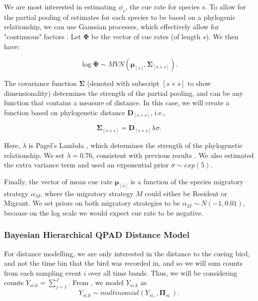 \documentclass[12pt]{article}
\begin{document}
\par We are most interested in estimating $\phi_s$, the cue rate for species $s$. 
To allow for the partial pooling of estimates for each species to be based on a phylogenic relationship, we can use Gaussian processes, which effectively allow for "continuous" factors \citep{bernardo_regression_1998, mcelreath_continous_2020}. 
Let $\mathbf{\Phi}$ be the vector of cue rates (of length $s$). 
We then have:

$$\log \mathbf{\Phi} \sim MVN\left( \mathbf{\mu}_{[s]}, \mathbf{\Sigma}_{[s \times s]} \right).$$

\par The covariance function $\mathbf{\Sigma}$ (denoted with subscript $[s \times s]$ to show dimensionality) determines the strength of the partial pooling, and can be any function that contains a measure of distance. 
In this case, we will create a function based on phylogenetic distance $\mathbf{D}_{[s \times s]}$, i.e.,

$$\mathbf{\Sigma}_{[s \times s]} = \mathbf{D}_{[s \times s]}\lambda\sigma.$$

\par Here, $\lambda$ is Pagel's Lambda \citep{pagel_inferring_1999}, which determines the strength of the phylogenetic relationship. 
We set $\lambda = 0.76$, consistent with previous results \cite{solymos_phylogeny_2018}. 
We also estimated the extra variance term and used an exponential prior $\sigma \sim exp(5)$.

\par Finally, the vector of mean cue rate $\mathbf{\mu}_{[s]}$ is a function of the species migratory strategy $\alpha_M$, where the migratory strategy $M$ could either be Resident or Migrant. 
We set priors on both migratory strategies to be $\alpha_M \sim N(-1, 0.01)$, because on the log scale we would expect cue rate to be negative. 

\subsubsection{Bayesian Hierarchical QPAD Distance Model}

\par For distance modelling, we are only interested in the distance to the cueing bird, and not the time bin that the bird was recorded in, and so we will sum counts from each sampling event $i$ over all time bands. 
Thus, we will be considering counts $Y_{si.k} = \sum_{j=1}^{J}$. 
From \citet{solymos_calibrating_2013}, we model $Y_{si.k}$ as
$$Y_{si.k} \sim multinomial\left(Y_{si..}, \mathbf{\Pi}_{si.}\right).$$
\end{document}
